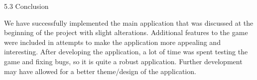 \documentclass{article}
\begin{document}
5.3 Conclusion

We have successfully implemented the main application that was discussed at the beginning of the project with slight alterations. Additional features to the game were included in attempts to make the application more appealing and interesting. After developing the application, a lot of time was spent testing the game and fixing bugs, so it is quite a robust application. Further development may have allowed for a better theme/design of the application.



\end{document}
